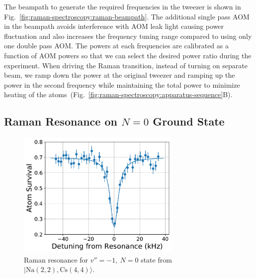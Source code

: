 The beampath to generate the required frequencies in the tweezer is shown in
Fig.~\ref{fig:raman-spectroscopy:raman-beampath}.
The additional single pass AOM in the beampath avoids interference
with AOM leak light causing power fluctuation and
also increases the frequency tuning range compared to using only one double pass AOM.
The powers at each frequencies are calibrated as a function of AOM powers
so that we can select the desired power ratio during the experiment.
When driving the Raman transition, instead of turning on separate beam,
we ramp down the power at the original tweezer and ramping up the power
in the second frequency while maintaining the total power to minimize heating of
the atoms~(Fig.~\ref{fig:raman-spectroscopy:apparatus-sequence}B).

\subsection{Raman Resonance on $N=0$ Ground State}
\label{ch:raman-spectroscopy:states:n0}

\begin{figure}
  \centering
  \includegraphics[width=0.7\textwidth]{figures/raman_spectroscopy_resonance.pdf}
  \caption[Raman resonance for $v''=-1,\ N=0$ state]{
    Raman resonance for $v''=-1,\ N=0$ state from $|\mathrm{Na(2, 2),Cs(4, 4)}\rangle$.
    \label{fig:raman-spectroscopy:resonance}}
\end{figure}

